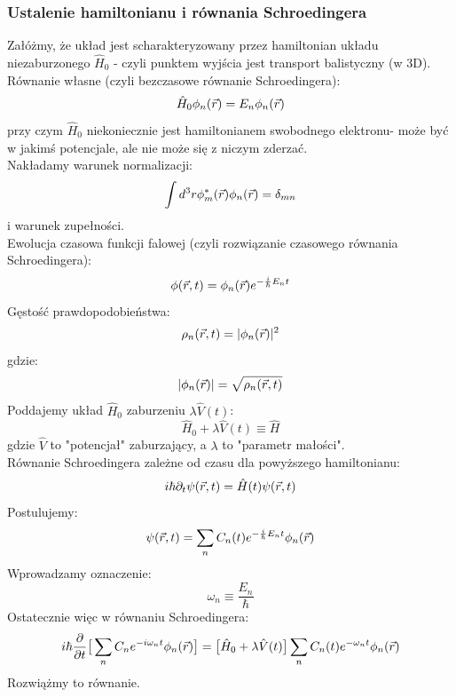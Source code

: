 \subsubsection{Ustalenie hamiltonianu i równania Schroedingera}
Załóżmy, że układ jest scharakteryzowany przez hamiltonian układu niezaburzonego $\hat{H}_0$ - czyli punktem wyjścia jest transport balistyczny (w 3D).\\
Równanie własne (czyli bezczasowe równanie Schroedingera):
\begin{equation} \hat{H}_0\phi_n(\vec{r})=E_n\phi_n(\vec{r})\label{w8h0}\end{equation}
przy czym $\hat{H}_0$ niekoniecznie jest hamiltonianem swobodnego elektronu- może być w jakimś potencjale, ale nie może się z niczym zderzać.\\
Nakładamy warunek normalizacji:
\begin{equation}\int d^3r\phi_m^*(\vec{r})\phi_n(\vec{r})=\delta_{mn}\end{equation}
i warunek zupełności.\\
Ewolucja czasowa funkcji falowej (czyli rozwiązanie czasowego równania Schroedingera):
\begin{equation}\phi(\vec{r},t)=\phi_n(\vec{r})e^{-\frac{i}{\hbar}E_nt}\end{equation}
Gęstość prawdopodobieństwa:
\begin{equation}\rho_n(\vec{r},t)=|\phi_n(\vec{r})|^2\end{equation}
gdzie:
\begin{equation}|\phi_n(\vec{r})|=\sqrt{\rho_n(\vec{r},t)}\end{equation}
Poddajemy układ $\hat{H}_0$ zaburzeniu $\lambda\hat{V}(t)$:
\begin{equation}\hat{H}_0+\lambda\hat{V}(t)\equiv \hat{H}\end{equation}
gdzie $\hat{V}$ to "potencjał" zaburzający, a $\lambda$ to "parametr małości".\\
Równanie Schroedingera zależne od czasu dla powyższego hamiltonianu:
\begin{equation}i\hbar\partial_t\psi(\vec{r},t)=\hat{H}(t)\psi(\vec{r},t)\end{equation}
Postulujemy:
\begin{equation}\psi(\vec{r},t)=\sum_n C_n(t)e^{-\frac{i}{\hbar}E_nt}\phi_n(\vec{r})\end{equation}
Wprowadzamy oznaczenie:
\begin{equation}\omega_n\equiv \frac{E_n}{\hbar}\end{equation}
Ostatecznie więc w równaniu Schroedingera:
\begin{equation}i\hbar\frac{\partial}{\partial t} \big[
\sum_n C_n e^{-i\omega_n t}\phi_n(\vec{r}) \big]=
\big[\hat{H}_0+\lambda\hat{V}(t)\big] 
\sum_n C_n(t)e^{-\omega_n t}\phi_n(\vec{r})\end{equation}
Rozwiążmy to równanie.

